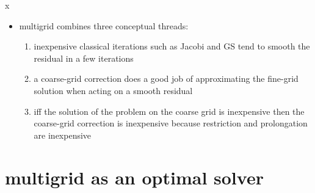 \documentclass[10pt,
               svgnames,
               hyperref={colorlinks,citecolor=DeepPink4,linkcolor=FireBrick,urlcolor=Maroon},
               usepdftitle=false]{beamer}
\begin{document}
\begin{frame}{x}
\begin{itemize}
\item multigrid combines three conceptual threads:
\begin{enumerate}
\item inexpensive classical iterations such as Jacobi and GS tend to smooth the residual in a few iterations
\item a coarse-grid correction does a good job of approximating the fine-grid solution when acting on a smooth residual
\item iff the solution of the problem on the coarse grid is inexpensive then the coarse-grid correction is inexpensive because restriction and prolongation are inexpensive
\end{enumerate}
\end{itemize}
\end{frame}



\section{multigrid as an optimal solver}
\end{document}
